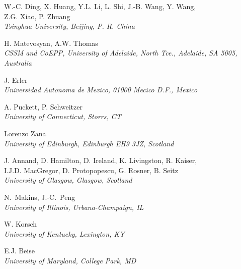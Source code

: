 \documentclass[12pt]{article}
\begin{document}
\begin{center}
\large {W.-C. Ding, X. Huang, Y.L. Li, L. Shi, J.-B. Wang, Y. Wang,\\  
Z.G. Xiao, P. Zhuang}\\
\it{Tsinghua University, Beijing, P. R. China}
\end{center}

\begin{center}
\large{H. Matevosyan, A.W. Thomas} \\
\it{CSSM and CoEPP, University of Adelaide, North Tce., Adelaide, SA 5005, Australia}
\end{center}

\begin{center}
\large{J. Erler} \\
\it{Universidad Autonoma de Mexico, 01000 Mecico D.F., Mexico}
\end{center}


\begin{center}
\large{A. Puckett, P. Schweitzer} \\
\it{University of Connecticut, Storrs, CT}
\end{center}

\begin{center}
\large{Lorenzo Zana} \\
\it{University of Edinburgh, Edinburgh EH9 3JZ, Scotland}
\end{center}


\begin{center}
\large{J. Annand, D. Hamilton, D. Ireland, K. Livingston, R. Kaiser, \\
I.J.D. MacGregor, D. Protopopescu, G. Rosner, B. Seitz}\\   
\it{University of Glasgow, Glasgow, Scotland}
\end{center}

\begin{center}
\large{N.~Makins, 
J.-C.~Peng}\\   
\it{University of Illinois, Urbana-Champaign, IL}
\end{center}

\begin{center}
\large{W. Korsch}\\   
\it{University of Kentucky, Lexington, KY}
\end{center}

\begin{center}
\large{E.J. Beise}\\   
\it{University of Maryland, College Park, MD}
\end{center}
\end{document}
